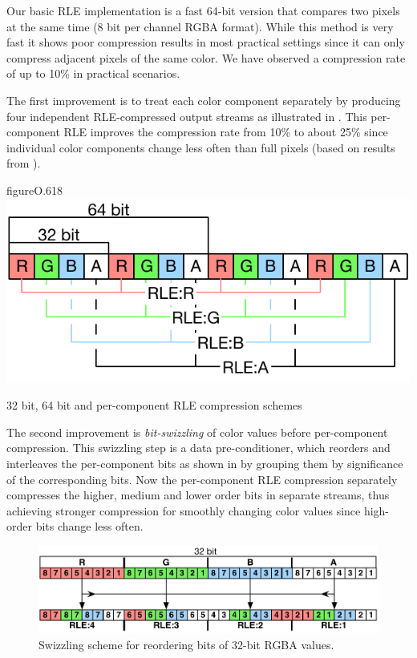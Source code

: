 Our basic RLE implementation is a fast 64-bit version that compares two pixels
at the same time (8 bit per channel RGBA format). While this method is very
fast it shows poor compression results in most practical settings since it can
only compress adjacent pixels of the same color. We have observed a compression
rate of up to 10\% in practical scenarios.

The first improvement is to treat each color component separately by producing
four independent RLE-compressed output streams as illustrated in .
This per-component RLE improves the compression rate from 10\% to about 25\%
since individual color components change less often than full pixels (based on
results from \cite{MEP:10}).

\begin{wrapfloat}{figure}{O}{.618\textwidth}
  \includegraphics[width=.618\textwidth]{images/RLE}
  \caption{32 bit, 64 bit and per-component RLE compression schemes}
  \label{fRLE}
\end{wrapfloat}

The second improvement is {\em bit-swizzling} of color values before
per-component compression. This swizzling step is a data pre-conditioner, which
reorders and interleaves the per-component bits as shown in  by
grouping them by significance of the corresponding bits. Now the per-component
RLE compression separately compresses the higher, medium and lower order bits
in separate streams, thus achieving stronger compression for smoothly changing
color values since high-order bits change less often.

\begin{figure}[h!t]
  \centering
  \includegraphics[width=\textwidth]{images/swizzle}
  \caption{Swizzling scheme for reordering bits of 32-bit RGBA values.}
  \label{fSwizzle}
\end{figure}

